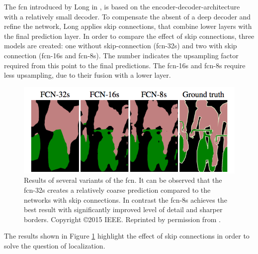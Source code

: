The \gls{fcn} introduced by Long in \cite{LSD15-FCN}, is based on the encoder-decoder-architecture with a relatively small decoder.
To compensate the absent of a deep decoder and refine the network, Long applies skip connections, that combine lower layers with the final prediction layer.
In order to compare the effect of skip connections, three models are created: one without skip-connection (\gls{fcn}-32s) and two with skip connection (\gls{fcn}-16s and \gls{fcn}-8s).
The number indicates the upsampling factor required from this point to the final predictions.
The \gls{fcn}-16s and \gls{fcn}-8s require less upsampling, due to their fusion with a lower layer.
\begin{figure}
	\includegraphics[width=\linewidth]{figures/chap223_fcn_results.png}	
	\caption[\gls{fcn} Predictions]{
		Results of several variants of the \gls{fcn}. 
		It can be observed that the \gls{fcn}-32s creates a relatively coarse prediction compared to the networks with skip connections.
		In contrast the \gls{fcn}-8s achieves the best result with significantly improved level of detail and sharper borders.
		Copyright \copyright 2015 IEEE. Reprinted by permission from \cite{LSD15-FCN}.}
	\label{fig:ch2:sec2:fcn_res}
\end{figure}
The results shown in Figure \ref{fig:ch2:sec2:fcn_res} highlight the effect of skip connections in order to solve the question of localization.

